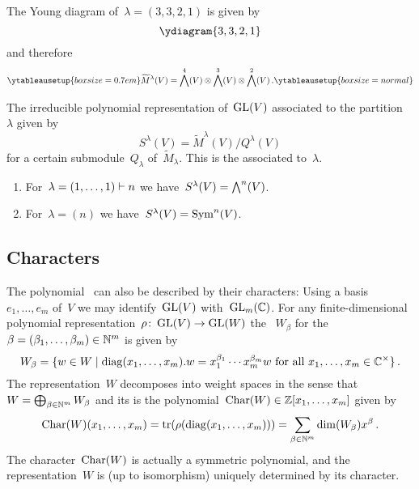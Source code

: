 \documentclass[a4paper,10pt]{scrartcl}
\begin{document}
\begin{example}
  The Young diagram of~$\lambda = (3,3,2,1)$ is given by
  \[
    \ydiagram{3,3,2,1}
  \]
  and therefore
  \[
    \ytableausetup{boxsize=0.7em}
    \widetilde{M}^{\lambda}(V)
    =
    \Exterior^4(V) \tensor \Exterior^3(V) \tensor \Exterior^2(V) \,.
    \ytableausetup{boxsize=normal}
  \]
\end{example}

The irreducible polynomial representation of~$\operatorname{GL}(V)$ associated to the partition~$\lambda$ given by
\[
  S^{\lambda}(V)
  =
  \widetilde{M}^{\lambda}(V)/Q^{\lambda}(V)
\]
for a certain submodule~$Q_\lambda$ of~$\widetilde{M}_\lambda$.
This is the  associated to~$\lambda$.

\begin{example}
  \leavevmode
  \begin{enumerate}
    \item
      For~$\lambda = (1, \dotsc, 1) \vdash n$ we have~$S^{\lambda}(V) = \bigwedge^n(V)$.
    \item
      For~$\lambda = (n)$ we have~$S^{\lambda}(V) = \operatorname{Sym}^n(V)$.
  \end{enumerate}
\end{example}



\subsection{Characters}

The polynomial~{} can also be described by their characters:
Using a basis~$e_1, \dotsc, e_m$ of~$V$ we may identify~$\operatorname{GL}(V)$ with~$\operatorname{GL}_m(\mathbb{C})$.
For any finite-dimensional polynomial representation~$\rho \colon \operatorname{GL}(V) \to \operatorname{GL}(W)$ the ~$W_\beta$ for the ~$\beta = (\beta_1, \dotsc, \beta_m) \in \mathbb{N}^m$ is given by
\[
  W_\beta
  =
  \{
    w \in W
  \suchthat
    \text{$\diag(x_1, \dotsc, x_m).w = x_1^{\beta_1} \dotsm x_m^{\beta_m} w$ for all~$x_1, \dotsc, x_m \in \Complex^{\times}$}
  \} \,.
\]
The representation~$W$ decomposes into weight spaces in the sense that~$W = \bigoplus_{\beta \in \mathbb{N}^m} W_\beta$ and its  is the polynomial~$\operatorname{Char}(W) \in \mathbb{Z}[x_1, \dotsc, x_m]$ given by
\[
  \operatorname{Char}(W)(x_1, \dotsc, x_m)
  =
  \operatorname{tr}(\rho(\operatorname{diag}(x_1, \dotsc, x_m)))
  =
  \sum_{\beta \in \mathbb{N}^m} \dim(W_\beta) x^\beta \,.
\]
The character~$\operatorname{Char}(W)$ is actually a symmetric polynomial, and the representation~$W$ is (up to isomorphism) uniquely determined by its character.
\end{document}
